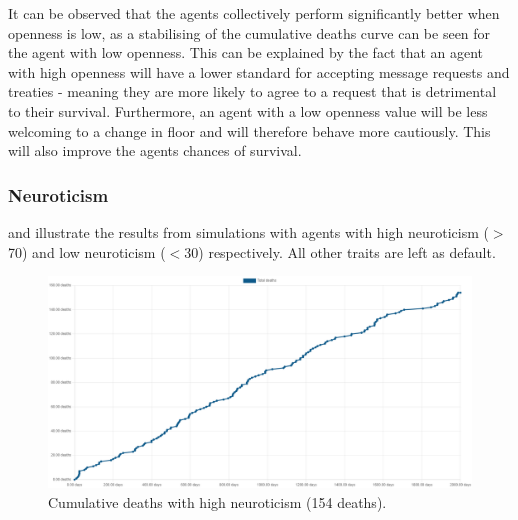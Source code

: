 It can be observed that the agents collectively perform significantly better when openness is low, as a stabilising of the cumulative deaths curve can be seen for the agent with low openness. This can be explained by the fact that an agent with high openness will have a lower standard for accepting message requests and treaties - meaning they are more likely to agree to a request that is detrimental to their survival. Furthermore, an agent with a low openness value will be less welcoming to a change in floor and will therefore behave more cautiously. This will also improve the agents chances of survival. 

\subsubsection{Neuroticism}
\label{subsubsec: Neuroticism}

 and  illustrate the results from simulations with agents with high neuroticism ($>$70) and low neuroticism ($<$30) respectively. All other traits are left as default.

\begin{figure}[H]
    \begin{center}
        \includegraphics[scale=0.25]{009_team_7_agent_design/Images/Cumulative Deaths, With Treaties, T7Only, 2000days, 20food, High Neur, 154deaths.png}
    \end{center}
    \caption{Cumulative deaths with high neuroticism (154 deaths).}
    \label{fig: High Neuroticism}
\end{figure}

